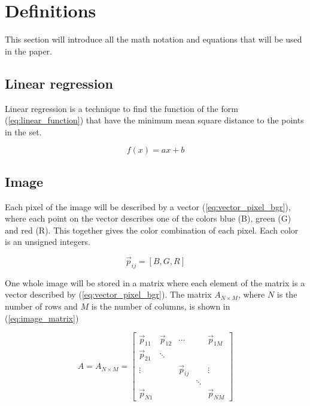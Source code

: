 \section{Definitions}
This section will introduce all the math notation and equations that will be used in the paper. 

\subsection{Linear regression}
\label{sec:regression}
Linear regression is a technique to find the function of the form (\ref{eq:linear_function}) that have the minimum mean square distance to the points in the set. 

\begin{equation}
    f(x) = ax + b
    \label{eq:linear_function}
\end{equation}

\subsection{Image}

Each pixel of the image will be described by a vector (\ref{eq:vector_pixel_bgr}), where each point on the vector describes one of the colors blue (B), green (G) and red (R).  This together gives the color combination of each pixel. Each color is an unsigned integers. 


\begin{equation}
    \label{eq:vector_pixel_bgr}
    \vec{p}_{ij} = [B,G,R]
\end{equation} 

One whole image will be stored in a matrix where each element of the matrix is a vector described by (\ref{eq:vector_pixel_bgr}). The matrix $A_{N \times M}$, where $N$ is the number of rows and $M$ is the number of columns, is shown in (\ref{eq:image_matrix})

\begin{equation}
    \label{eq:image_matrix}
    A = A_{N \times M} =  
    \begin{bmatrix}
        \vec{p}_{11} & \vec{p}_{12} & \cdots & & \vec{p}_{1M}  \\
        \vec{p}_{21} & \ddots &        &       &                \\
        \vdots       &        &\vec{p}_{ij}&   & \vdots          \\
                     &        &        & \ddots&                  \\
        \vec{p}_{N1} &        &        &       & \vec{p}_{NM}  
    \end{bmatrix}
\end{equation}

